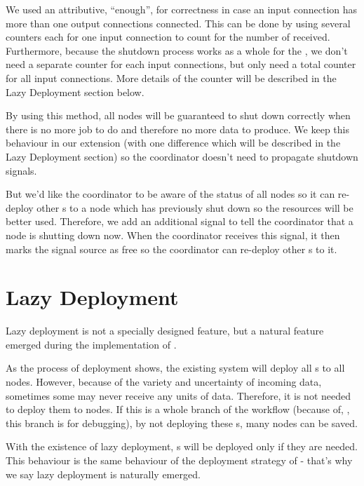 We used an attributive, ``enough'', for correctness in case an input connection has more than one output connections connected. This can be done by using several counters each for one input connection to count for the number of \dEOS received. Furthermore, because the shutdown process works as a whole for the \tPEInst, we don't need a separate counter for each input connections, but only need a total counter for all input connections. More details of the counter will be described in the Lazy Deployment section below.

By using this method, all nodes will be guaranteed to shut down correctly when there is no more job to do and therefore no more data to produce. We keep this behaviour in our extension (with one difference which will be described in the Lazy Deployment section) so the coordinator doesn't need to propagate shutdown signals.

But we'd like the coordinator to be aware of the status of all nodes so it can re-deploy other \tPEInst{}s to a node which has previously shut down so the resources will be better used. Therefore, we add an additional signal to tell the coordinator that a node is shutting down now. When the coordinator receives this signal, it then marks the signal source as free so the coordinator can re-deploy other \tPEInst{}s to it.

\section{Lazy Deployment}
Lazy deployment is not a specially designed feature, but a natural feature emerged during the implementation of \tincdep.

As the process of deployment shows, the existing \dpy system will deploy all \tPEInst{}s to all nodes. However, because of the variety and uncertainty of incoming data, sometimes some \tPEInst may never receive any units of data. Therefore, it is not needed to deploy them to nodes. If this is a whole branch of the workflow (because of, \eg, this branch is for debugging), by not deploying these \tPEInst{}s, many nodes can be saved.

With the existence of lazy deployment, \tPEInst{}s will be deployed only if they are needed. This behaviour is the same behaviour of the deployment strategy of \tincdep - that's why we say lazy deployment is naturally emerged.

